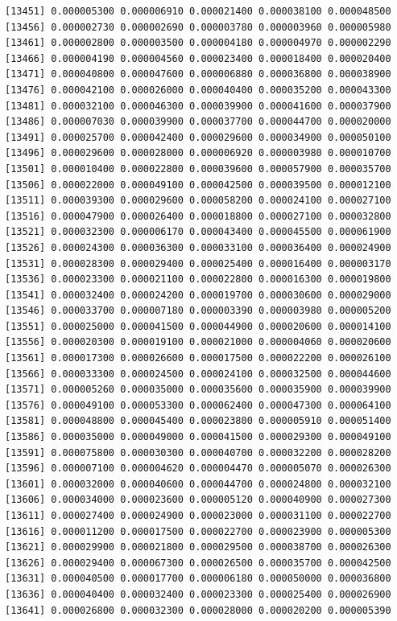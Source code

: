 \documentclass[]{article}
\begin{document}
\begin{verbatim}
[13451] 0.000005300 0.000006910 0.000021400 0.000038100 0.000048500
[13456] 0.000002730 0.000002690 0.000003780 0.000003960 0.000005980
[13461] 0.000002800 0.000003500 0.000004180 0.000004970 0.000002290
[13466] 0.000004190 0.000004560 0.000023400 0.000018400 0.000020400
[13471] 0.000040800 0.000047600 0.000006880 0.000036800 0.000038900
[13476] 0.000042100 0.000026000 0.000040400 0.000035200 0.000043300
[13481] 0.000032100 0.000046300 0.000039900 0.000041600 0.000037900
[13486] 0.000007030 0.000039900 0.000037700 0.000044700 0.000020000
[13491] 0.000025700 0.000042400 0.000029600 0.000034900 0.000050100
[13496] 0.000029600 0.000028000 0.000006920 0.000003980 0.000010700
[13501] 0.000010400 0.000022800 0.000039600 0.000057900 0.000035700
[13506] 0.000022000 0.000049100 0.000042500 0.000039500 0.000012100
[13511] 0.000039300 0.000029600 0.000058200 0.000024100 0.000027100
[13516] 0.000047900 0.000026400 0.000018800 0.000027100 0.000032800
[13521] 0.000032300 0.000006170 0.000043400 0.000045500 0.000061900
[13526] 0.000024300 0.000036300 0.000033100 0.000036400 0.000024900
[13531] 0.000028300 0.000029400 0.000025400 0.000016400 0.000003170
[13536] 0.000023300 0.000021100 0.000022800 0.000016300 0.000019800
[13541] 0.000032400 0.000024200 0.000019700 0.000030600 0.000029000
[13546] 0.000033700 0.000007180 0.000003390 0.000003980 0.000005200
[13551] 0.000025000 0.000041500 0.000044900 0.000020600 0.000014100
[13556] 0.000020300 0.000019100 0.000021000 0.000004060 0.000020600
[13561] 0.000017300 0.000026600 0.000017500 0.000022200 0.000026100
[13566] 0.000033300 0.000024500 0.000024100 0.000032500 0.000044600
[13571] 0.000005260 0.000035000 0.000035600 0.000035900 0.000039900
[13576] 0.000049100 0.000053300 0.000062400 0.000047300 0.000064100
[13581] 0.000048800 0.000045400 0.000023800 0.000005910 0.000051400
[13586] 0.000035000 0.000049000 0.000041500 0.000029300 0.000049100
[13591] 0.000075800 0.000030300 0.000040700 0.000032200 0.000028200
[13596] 0.000007100 0.000004620 0.000004470 0.000005070 0.000026300
[13601] 0.000032000 0.000040600 0.000044700 0.000024800 0.000032100
[13606] 0.000034000 0.000023600 0.000005120 0.000040900 0.000027300
[13611] 0.000027400 0.000024900 0.000023000 0.000031100 0.000022700
[13616] 0.000011200 0.000017500 0.000022700 0.000023900 0.000005300
[13621] 0.000029900 0.000021800 0.000029500 0.000038700 0.000026300
[13626] 0.000029400 0.000067300 0.000026500 0.000035700 0.000042500
[13631] 0.000040500 0.000017700 0.000006180 0.000050000 0.000036800
[13636] 0.000040400 0.000032400 0.000023300 0.000025400 0.000026900
[13641] 0.000026800 0.000032300 0.000028000 0.000020200 0.000005390

\end{verbatim}
\end{document}
